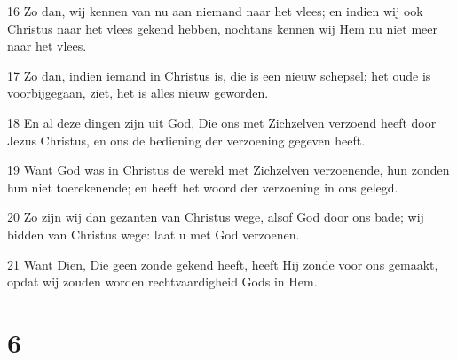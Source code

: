 \par 16 Zo dan, wij kennen van nu aan niemand naar het vlees; en indien wij ook Christus naar het vlees gekend hebben, nochtans kennen wij Hem nu niet meer naar het vlees.
\par 17 Zo dan, indien iemand in Christus is, die is een nieuw schepsel; het oude is voorbijgegaan, ziet, het is alles nieuw geworden.
\par 18 En al deze dingen zijn uit God, Die ons met Zichzelven verzoend heeft door Jezus Christus, en ons de bediening der verzoening gegeven heeft.
\par 19 Want God was in Christus de wereld met Zichzelven verzoenende, hun zonden hun niet toerekenende; en heeft het woord der verzoening in ons gelegd.
\par 20 Zo zijn wij dan gezanten van Christus wege, alsof God door ons bade; wij bidden van Christus wege: laat u met God verzoenen.
\par 21 Want Dien, Die geen zonde gekend heeft, heeft Hij zonde voor ons gemaakt, opdat wij zouden worden rechtvaardigheid Gods in Hem.

\chapter{6}

